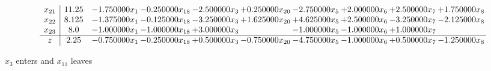 \documentclass[10pt]{article}
\begin{document}
\[\begin{array}{c| c c@{\hskip 2pt} c@{\hskip 2pt} c@{\hskip 2pt} c@{\hskip 2pt} c@{\hskip 2pt} c@{\hskip 2pt} c@{\hskip 2pt} c@{\hskip 2pt} }
 x_{21}   &  11.25 & -1.750000 x_{1} & -0.250000 x_{18} & -2.500000 x_{3} & + 0.250000 x_{20} & -2.750000 x_{5} & + 2.000000 x_{6} & + 2.500000 x_{7} & + 1.750000 x_{8}\\
 x_{22}   &  8.125 & -1.375000 x_{1} & -0.125000 x_{18} & -3.250000 x_{3} & + 1.625000 x_{20} & + 4.625000 x_{5} & + 2.500000 x_{6} & -3.250000 x_{7} & -2.125000 x_{8}\\
 x_{23}   &  8.0 & -1.000000 x_{1} & -1.000000 x_{18} & + 3.000000 x_{3} &   & -1.000000 x_{5} & -1.000000 x_{6} & + 1.000000 x_{7} &   \\
\hline
z    &  2.25 & -0.750000 x_{1} & -0.250000 x_{18} & + 0.500000 x_{3} & -0.750000 x_{20} & -4.750000 x_{5} & -1.000000 x_{6} & + 0.500000 x_{7} & -1.250000 x_{8}\\
\end{array}\]


 $ x_{3} $ enters and $ x_{11} $ leaves 
\end{document}
